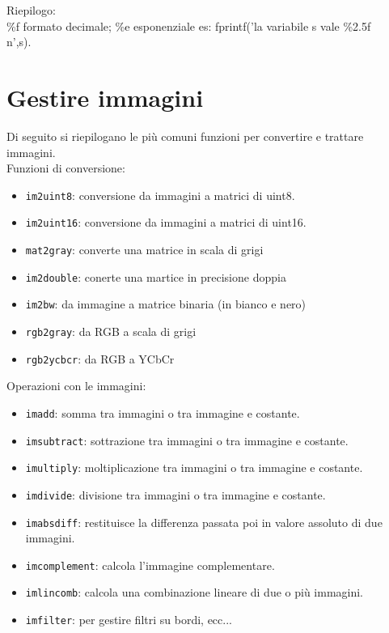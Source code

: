 Riepilogo: \\
\%f formato decimale; \%e esponenziale es: fprintf('la variabile s vale \%2.5f \\n',s).

\section{Gestire immagini}
Di seguito si riepilogano le più comuni funzioni per convertire e trattare immagini.\\

Funzioni di conversione: \\
\begin{itemize}
    \item	\texttt{im2uint8}: conversione da immagini a matrici di uint8.
    \item	\texttt{im2uint16}: conversione da immagini a matrici di uint16.
    \item	\texttt{mat2gray}: converte una matrice in scala di grigi
    \item	\texttt{im2double}: conerte una martice in precisione doppia
    \item	\texttt{im2bw}: da immagine a matrice binaria (in bianco e nero)
    \item	\texttt{rgb2gray}: da RGB a scala di grigi
    \item	\texttt{rgb2ycbcr}: da RGB a YCbCr
\end{itemize}

Operazioni con le immagini: \\

\begin{itemize}
    \item	\texttt{imadd}: somma tra immagini o tra immagine e costante.
    \item	\texttt{imsubtract}: sottrazione tra immagini o tra immagine e costante.
    \item	\texttt{imultiply}: moltiplicazione tra immagini o tra immagine e costante.
    \item	\texttt{imdivide}: divisione tra immagini o tra immagine e costante.
    \item	\texttt{imabsdiff}: restituisce la differenza passata poi in valore assoluto di due immagini.
    \item	\texttt{imcomplement}: calcola l'immagine complementare.
    \item	\texttt{imlincomb}: calcola una combinazione lineare di due o più immagini.
    \item	\texttt{imfilter}: per gestire filtri su bordi, ecc...
\end{itemize}

